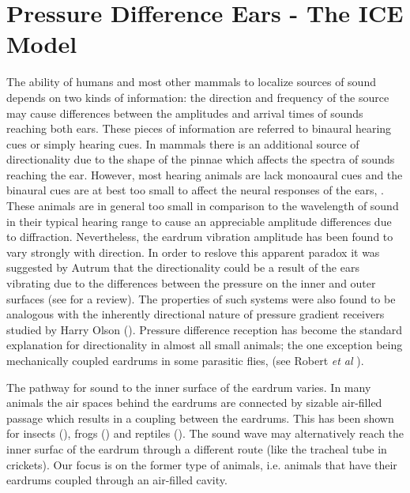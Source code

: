 \section{Pressure Difference Ears - The ICE Model}\label{iceintrosection}
The ability of humans and most other mammals to localize sources of sound depends on two kinds of information: the direction and frequency
of the source may cause differences between the amplitudes and arrival times of sounds reaching both ears. These pieces of information are
referred to binaural hearing cues or simply hearing cues. In mammals there is an additional source of directionality due to the shape
of the pinnae which affects the spectra of sounds reaching the ear. However, most hearing animals are lack monoaural cues and the binaural
cues are at best too small to affect the neural responses of the ears, \cite{michelsen1}. These animals are in general too small in comparison
to the wavelength of sound in their typical hearing range to cause an appreciable amplitude differences due to diffraction. Nevertheless, 
the eardrum vibration amplitude has been found to vary strongly with direction. In order to reslove this apparent paradox it was
suggested by Autrum \cite{autrumjcomphys} that the directionality could be a result of the ears vibrating due to the
differences between the pressure on the inner and outer surfaces (see \cite{michelsenlarsen} for a review).  The properties of such systems were also found to be analogous with the inherently directional 
nature of pressure gradient receivers studied by Harry Olson (\cite{olsonmichrophones}). Pressure difference reception has
become the standard explanation for directionality in almost all small animals; the one exception being mechanically coupled
eardrums in some parasitic flies, (see Robert \emph{et al} \cite{roberthoy}).

The pathway for sound to the inner surface of the eardrum varies. In many animals the air spaces behind the eardrums are
connected by sizable air-filled passage which results in a coupling between the eardrums. This has been shown for 
insects (\cite{michelsenbiophysics}), frogs (\cite{jorgensenanurans}) and reptiles (\cite{dalsgaardmanley1}). The sound wave
may alternatively reach the inner surfac of the eardrum through a different route (like the tracheal tube in crickets). Our focus
is on the former type of animals, i.e. animals that have their eardrums coupled through an air-filled cavity.

